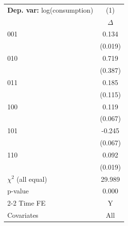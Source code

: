 \begin{tabular}{l c} \toprule  \textbf{Dep. var:}  log(consumption) 
                    &\multicolumn{1}{c}{(1)}         \\
                    &    $\Delta$         \\
001                 &       0.134\sym{***}\\
                    &     (0.019)         \\
010                 &       0.719\sym{*}  \\
                    &     (0.387)         \\
011                 &       0.185         \\
                    &     (0.115)         \\
100                 &       0.119\sym{*}  \\
                    &     (0.067)         \\
101                 &      -0.245\sym{***}\\
                    &     (0.067)         \\
110                 &       0.092\sym{***}\\
                    &     (0.019)         \\
\addlinespace
$\chi^2$ (all equal)&      29.989         \\
p-value             &       0.000         \\
\cmidrule{2-2} Time FE & Y \\ Covariates & All \\ \bottomrule \end{tabular}
